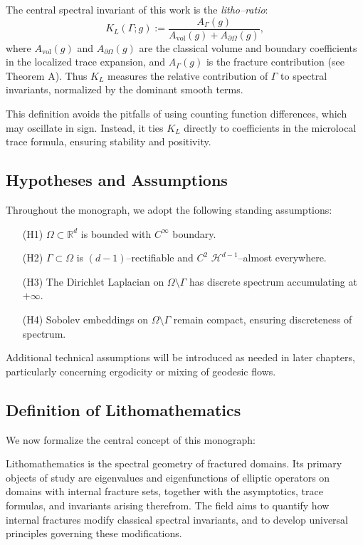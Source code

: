 The central spectral invariant of this work is the \emph{litho–ratio}:
\[
  K_L(\Gamma;g) := \frac{A_\Gamma(g)}{A_{\mathrm{vol}}(g) + A_{\partial\Omega}(g)},
\]
where $A_{\mathrm{vol}}(g)$ and $A_{\partial\Omega}(g)$ are the classical 
volume and boundary coefficients in the localized trace expansion, and 
$A_\Gamma(g)$ is the fracture contribution (see Theorem A). Thus $K_L$ 
measures the relative contribution of $\Gamma$ to spectral invariants, 
normalized by the dominant smooth terms.

This definition avoids the pitfalls of using counting function differences, 
which may oscillate in sign. Instead, it ties $K_L$ directly to coefficients 
in the microlocal trace formula, ensuring stability and positivity.

\subsection{Hypotheses and Assumptions}

Throughout the monograph, we adopt the following standing assumptions:

\begin{itemize}
  \item[(H1)] $\Omega\subset\mathbb R^d$ is bounded with $C^\infty$ boundary.
  \item[(H2)] $\Gamma\subset \Omega$ is $(d\!-\!1)$–rectifiable and $C^2$ 
  $\mathcal H^{d-1}$–almost everywhere.
  \item[(H3)] The Dirichlet Laplacian on $\Omega\setminus\Gamma$ has discrete 
  spectrum accumulating at $+\infty$.
  \item[(H4)] Sobolev embeddings on $\Omega\setminus\Gamma$ remain compact, 
  ensuring discreteness of spectrum.
\end{itemize}

Additional technical assumptions will be introduced as needed in later 
chapters, particularly concerning ergodicity or mixing of geodesic flows.

\subsection{Definition of Lithomathematics}

We now formalize the central concept of this monograph:

\begin{definition}[Lithomathematics]
  Lithomathematics is the spectral geometry of fractured domains. Its primary 
  objects of study are eigenvalues and eigenfunctions of elliptic operators on 
  domains with internal fracture sets, together with the asymptotics, trace 
  formulas, and invariants arising therefrom. The field aims to quantify how 
  internal fractures modify classical spectral invariants, and to develop 
  universal principles governing these modifications.
\end{definition}

